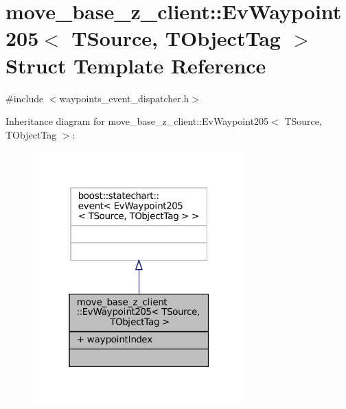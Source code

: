 \hypertarget{structmove__base__z__client_1_1EvWaypoint205}{}\section{move\+\_\+base\+\_\+z\+\_\+client\+:\+:Ev\+Waypoint205$<$ T\+Source, T\+Object\+Tag $>$ Struct Template Reference}
\label{structmove__base__z__client_1_1EvWaypoint205}


{\ttfamily \#include $<$waypoints\+\_\+event\+\_\+dispatcher.\+h$>$}



Inheritance diagram for move\+\_\+base\+\_\+z\+\_\+client\+:\+:Ev\+Waypoint205$<$ T\+Source, T\+Object\+Tag $>$\+:
\nopagebreak
\begin{figure}[H]
\begin{center}
\leavevmode
\includegraphics[width=232pt]{structmove__base__z__client_1_1EvWaypoint205__inherit__graph}
\end{center}
\end{figure}


